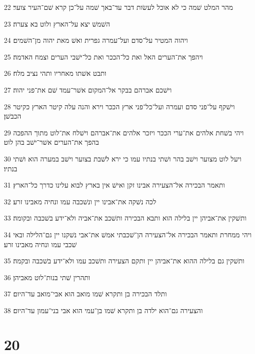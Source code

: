 \par 22 מהר המלט שׁמה כי לא אוכל לעשׂות דבר עד־באך שׁמה על־כן קרא שׁם־העיר צוער׃
\par 23 השׁמשׁ יצא על־הארץ ולוט בא צערה׃
\par 24 ויהוה המטיר על־סדם ועל־עמרה גפרית ואשׁ מאת יהוה מן־השׁמים׃
\par 25 ויהפך את־הערים האל ואת כל־הככר ואת כל־ישׁבי הערים וצמח האדמה׃
\par 26 ותבט אשׁתו מאחריו ותהי נציב מלח׃
\par 27 וישׁכם אברהם בבקר אל־המקום אשׁר־עמד שׁם את־פני יהוה׃
\par 28 וישׁקף על־פני סדם ועמרה ועל־כל־פני ארץ הככר וירא והנה עלה קיטר הארץ כקיטר הכבשׁן׃
\par 29 ויהי בשׁחת אלהים את־ערי הככר ויזכר אלהים את־אברהם וישׁלח את־לוט מתוך ההפכה בהפך את־הערים אשׁר־ישׁב בהן לוט׃
\par 30 ויעל לוט מצוער וישׁב בהר ושׁתי בנתיו עמו כי ירא לשׁבת בצוער וישׁב במערה הוא ושׁתי בנתיו׃
\par 31 ותאמר הבכירה אל־הצעירה אבינו זקן ואישׁ אין בארץ לבוא עלינו כדרך כל־הארץ׃
\par 32 לכה נשׁקה את־אבינו יין ונשׁכבה עמו ונחיה מאבינו זרע׃
\par 33 ותשׁקין את־אביהן יין בלילה הוא ותבא הבכירה ותשׁכב את־אביה ולא־ידע בשׁכבה ובקומה׃
\par 34 ויהי ממחרת ותאמר הבכירה אל־הצעירה הן־שׁכבתי אמשׁ את־אבי נשׁקנו יין גם־הלילה ובאי שׁכבי עמו ונחיה מאבינו זרע׃
\par 35 ותשׁקין גם בלילה ההוא את־אביהן יין ותקם הצעירה ותשׁכב עמו ולא־ידע בשׁכבה ובקמה׃
\par 36 ותהרין שׁתי בנות־לוט מאביהן׃
\par 37 ותלד הבכירה בן ותקרא שׁמו מואב הוא אבי־מואב עד־היום׃
\par 38 והצעירה גם־הוא ילדה בן ותקרא שׁמו בן־עמי הוא אבי בני־עמון עד־היום׃

\chapter{20}

